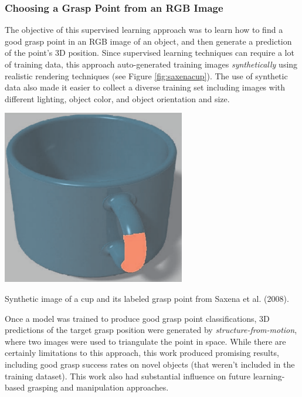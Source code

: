 \subsubsection{Choosing a Grasp Point from an RGB Image\cite{SaxenaDriemeyerEtAl2008}}
The objective of this supervised learning approach was to learn how to find a good grasp point in an RGB image of an object, and then generate a prediction of the point's 3D position. Since supervised learning techniques can require a lot of training data, this approach auto-generated training images \textit{synthetically} using realistic rendering techniques (see Figure \ref{fig:saxenacup}). The use of synthetic data also made it easier to collect a diverse training set including images with different lighting, object color, and object orientation and size.
\begin{marginfigure} [3\baselineskip]
\begin{center}
\includegraphics[width=0.6\textwidth]{tex/figs/ch26_figs/saxenacup.png}
\caption{Synthetic image of a cup and its labeled grasp point from Saxena et al. (2008).}
\label{fig:saxenacup}
\end{center}
\end{marginfigure}
Once a model was trained to produce good grasp point classifications, 3D predictions of the target grasp position were generated by \textit{structure-from-motion}, where two images were used to triangulate the point in space. While there are certainly limitations to this approach, this work produced promising results, including good grasp success rates on novel objects (that weren't included in the training dataset). This work also had substantial influence on future learning-based grasping and manipulation approaches.


